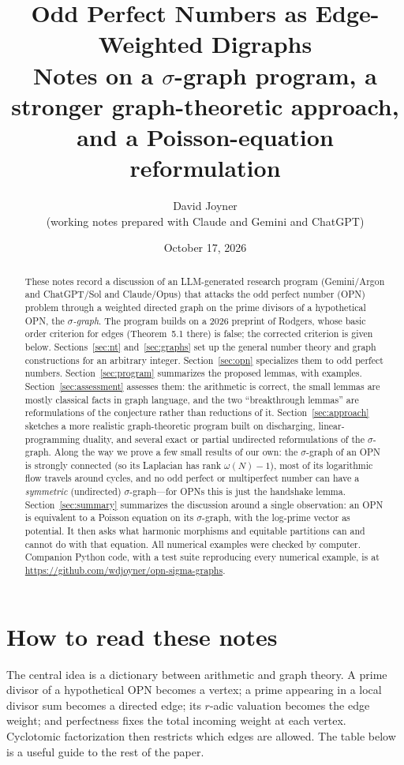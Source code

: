 \documentclass[11pt]{article}
\title{Odd Perfect Numbers as Edge-Weighted Digraphs\\[4pt]
\large Notes on a $\sigma$-graph program, a stronger graph-theoretic approach,\\
and a Poisson-equation reformulation}
\author{David Joyner\\{\small (working notes prepared with Claude and Gemini and ChatGPT)}}
\date{October 17, 2026}
\theoremstyle{definition}
\theoremstyle{remark}
\begin{document}
\maketitle

\begin{abstract}
These notes record a discussion of an LLM-generated research program
(Gemini/Argon and ChatGPT/Sol and Claude/Opus) that attacks the odd perfect number (OPN)
problem through a weighted directed graph on the prime divisors of a
hypothetical OPN, the \emph{$\sigma$-graph}.  The program builds on a 2026
preprint of Rodgers, whose basic order criterion for edges (Theorem~5.1
there) is false; the corrected criterion is given below.
Sections~\ref{sec:nt} and~\ref{sec:graphs} set up the general number theory
and graph constructions for an arbitrary integer.  Section~\ref{sec:opn}
specializes them to odd perfect numbers.
Section~\ref{sec:program} summarizes the proposed lemmas, with examples. Section~\ref{sec:assessment} assesses
them: the arithmetic is correct, the small lemmas are mostly classical
facts in graph language, and the two ``breakthrough lemmas'' are
reformulations of the conjecture rather than reductions of it. Section~\ref{sec:approach}
sketches a more realistic graph-theoretic program built on discharging,
linear-programming duality, and several exact or partial undirected
reformulations of the $\sigma$-graph.  Along the way we prove a few small
results of our own: the $\sigma$-graph of an OPN is strongly connected (so its
Laplacian has rank $\omega(N)-1$), most of its logarithmic flow travels around
cycles, and no odd perfect or multiperfect number can have a
\emph{symmetric} (undirected) $\sigma$-graph---for OPNs this is just the
handshake lemma. Section~\ref{sec:summary} summarizes the discussion
around a single observation: an OPN is equivalent to a Poisson equation on
its $\sigma$-graph, with the log-prime vector as potential.  It then asks
what harmonic morphisms and equitable partitions can and cannot do with that
equation.
All numerical examples were checked by computer.  Companion Python code,
with a test suite reproducing every numerical example, is at
\url{https://github.com/wdjoyner/opn-sigma-graphs}.
\end{abstract}

\tableofcontents

\section*{How to read these notes}
The central idea is a dictionary between arithmetic and graph theory.  A
prime divisor of a hypothetical OPN becomes a vertex; a prime appearing in a
local divisor sum becomes a directed edge; its $r$-adic valuation becomes the
edge weight; and perfectness fixes the total incoming weight at each vertex.
Cyclotomic factorization then restricts which edges are allowed.  The table
below is a useful guide to the rest of the paper.
\end{document}
